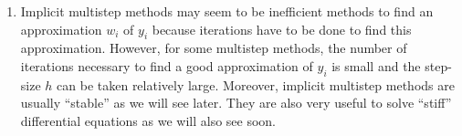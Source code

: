 \begin{rmkList}
\begin{enumerate}
Finally, let $w_{i+1}$ be the limit of
$\DS \left\{ w_{i+1}^{[k]} \right\}_{k=0}^\infty$.  We show that
$w_{i+1}$ is a solution of (\ref{MultistepSFsol}).  Since $G$ is a
continuous function, if we take the limit with respect to $k$ on both
sides of (\ref{MultistepSF}), we get
\[
w_{i+1} = \lim_{k\to \infty} w_{i+1}^{[k+1]} =
\lim_{k\to \infty} \left( A_i + h b_{-1}
G_i\left( w_{i+1}^{[k]} \right) + h F_i\right)
= A_i + h b_{-1} G_i(w_{i+1}) + h F_i \ .
\]
\label{bm1hLone}
\item Implicit multistep methods may seem to be inefficient methods to
find an approximation $w_i$ of $y_i$ because iterations have to be
done to find this approximation.  However, for some multistep methods,
the number of iterations necessary to find a good approximation
of $y_i$ is small and the step-size $h$ can be taken relatively
large.  Moreover, implicit multistep methods are usually
``stable'' as we will see later.  They are also very useful to solve
``stiff'' differential equations as we will also see soon.
\end{enumerate}
\label{bm1hL}
\end{rmkList}

